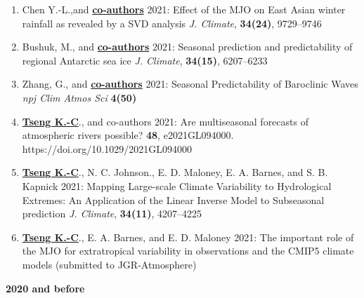 \documentclass{article}
\begin{document}
\begin{enumerate}[resume]   
	\item Chen Y.-L.,and \normalsize{\bf{\underline{co-authors}}} 2021: Effect of the MJO on East Asian winter rainfall as revealed by a SVD analysis \textit{J. Climate}, \normalsize{\bf{34(24)}}, 9729--9746 \par
	\item Bushuk, M., and \normalsize{\bf{\underline{co-authors}}} 2021: Seasonal prediction and predictability of regional Antarctic sea ice \textit{J. Climate}, \normalsize{\bf{34(15)}}, 6207--6233 \par
	\item Zhang, G., and \normalsize{\bf{\underline{co-authors}}} 2021: Seasonal Predictability of Baroclinic Waves \textit{npj Clim Atmos Sci} \normalsize{\bf{4(50)}}  \par
    \item \normalsize{\bf{\underline{Tseng K.-C}}}., and co-authors 2021: Are multiseasonal forecasts of atmospheric rivers possible? \normalsize{\bf{48}}, e2021GL094000. https://doi.org/10.1029/2021GL094000\par
	\item \normalsize{\bf{\underline{Tseng K.-C}}}., N. C. Johnson., E. D. Maloney, E. A. Barnes, and S. B. Kapnick 2021: Mapping Large-scale Climate Variability to Hydrological Extremes: An Application of the Linear Inverse Model to Subseasonal prediction \textit{J. Climate}, \normalsize{\bf{34(11)}}, 4207--4225 \par
	\item \normalsize{\bf{\underline{Tseng K.-C}}}., E. A. Barnes, and E. D. Maloney 2021: The important role of the MJO for extratropical variability in observations and the CMIP5 climate models (submitted to JGR-Atmosphere)  \par 
	 \end{enumerate}
\normalsize{\bf{2020} and before} 
\end{document}
